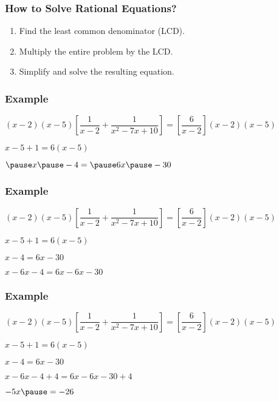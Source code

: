 \documentclass[14pt]{beamer}
\begin{document}
    \begin{frame}
    	\frametitle{How to Solve Rational Equations?}
    	\begin{enumerate}
    		\item Find the least common denominator (LCD).
    		\item Multiply the entire problem by the LCD.
    		\item Simplify and solve the resulting equation.
    	\end{enumerate}
    \end{frame}

    \begin{frame}
    	\frametitle{Example}
    	$ (x - 2 )(x - 5) \left[\dfrac{1}{x - 2} + \dfrac{1}{x^2 - 7x + 10} \right] = \left[\dfrac{6}{x - 2}\right] (x - 2) ( x - 5 ) $
    	
    	\vspace{1em} $ x - 5 + 1 = 6 (x - 5) $
    	
    	\vspace{1em} $ \pause x \pause - 4 = \pause 6x \pause - 30 $
    \end{frame}

    \begin{frame}
    	\frametitle{Example}
    	$ (x - 2 )(x - 5) \left[\dfrac{1}{x - 2} + \dfrac{1}{x^2 - 7x + 10} \right] = \left[\dfrac{6}{x - 2}\right] (x - 2) ( x - 5 ) $
    	
    	\vspace{1em} $ x - 5 + 1 = 6 (x - 5) $
    	
    	\vspace{1em} $  x - 4 =  6x - 30 $
    	
    	\vspace{1em} $  x -6x - 4 =  6x -6x  - 30 $
    \end{frame}

    \begin{frame}
    	\frametitle{Example}
    	$ (x - 2 )(x - 5) \left[\dfrac{1}{x - 2} + \dfrac{1}{x^2 - 7x + 10} \right] = \left[\dfrac{6}{x - 2}\right] (x - 2) ( x - 5 ) $
    	
    	\vspace{1em} $ x - 5 + 1 = 6 (x - 5) $
    	
    	\vspace{1em} $  x - 4 =  6x - 30 $
    	
    	\vspace{1em} $  x -6x - 4 + 4 =  6x -6x  - 30 + 4 $
    	
    	\pause \vspace{1em} $  -5x \pause =  - 26 $
    \end{frame}
\end{document}
